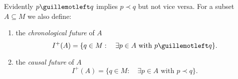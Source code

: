 Evidently \(p\guillemotleft q\) implies \(p\prec q\) but not vice versa. For a subset \(A \subseteq M\) we also define:
\begin{enumerate}
	\item the \emph{chronological future} of \(A\)
	\[
	I^+(A) =\{ q\in M :\quad\exists p \in A\text{ with } p\guillemotleft q\}.
	\]
	\item the \emph{causal future} of \(A\)
	\[
	I^+(A) =\{ q\in M : \quad\exists p \in A\text{ with } p\prec q\}.
	\]
\end{enumerate}

